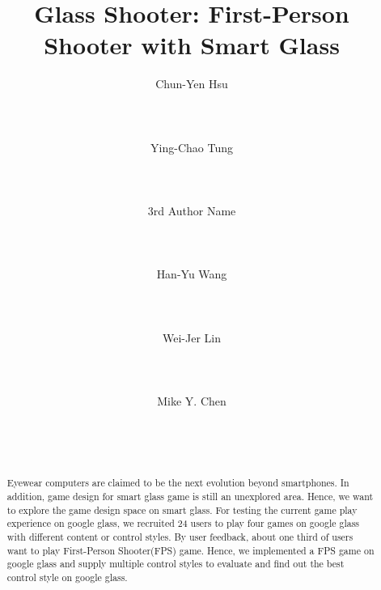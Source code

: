 \documentclass{sigchi}
\begin{document}
\title{Glass Shooter: First-Person Shooter with Smart Glass}

\author{
  \alignauthor Chun-Yen Hsu\\
    \\
    \\
    \\
  \alignauthor Ying-Chao Tung\\
    \\
    \\
    \\
  \alignauthor 3rd Author Name\\
    \\
    \\
    \\
  \alignauthor Han-Yu Wang\\
    \\
    \\
    \\
  \alignauthor Wei-Jer Lin\\
    \\
    \\
    \\
  \alignauthor Mike Y. Chen\\
    \\
    \\
    \\    
}

\maketitle

\begin{abstract}
Eyewear computers are claimed to be the next evolution beyond smartphones. In addition, game design for smart glass game is still an unexplored area. Hence, we want to explore the game design space on smart glass. For testing the current game play experience on google glass, we recruited 24 users to play four games on google glass with different content or control styles. By user feedback, about one third of users want to play First-Person Shooter(FPS) game. Hence, we implemented a FPS game on google glass and supply multiple control styles to evaluate and find out the best control style on google glass.
\end{abstract}
\end{document}
